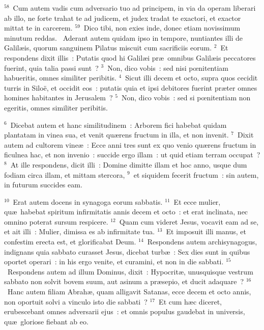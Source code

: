 ${}^{58}$~Cum autem vadis cum adversario tuo ad principem, in via da operam liberari ab illo, ne forte trahat te ad judicem, et judex tradat te exactori, et exactor mittat te in carcerem.
${}^{59}$~Dico tibi, non exies inde, donec etiam novissimum minutum reddas.
~Aderant autem quidam ipso in tempore, nuntiantes illi de Galil\ae is, quorum sanguinem Pilatus miscuit cum sacrificiis eorum.
${}^{2}$~Et respondens dixit illis~: Putatis quod hi Galil\ae i pr\ae\ omnibus Galil\ae is peccatores fuerint, quia talia passi sunt~?
${}^{3}$~Non, dico vobis~: sed nisi pœnitentiam habueritis, omnes similiter peribitis.
${}^{4}$~Sicut illi decem et octo, supra quos cecidit turris in Silo\"e, et occidit eos~: putatis quia et ipsi debitores fuerint pr\ae ter omnes homines habitantes in Jerusalem~?
${}^{5}$~Non, dico vobis~: sed si pœnitentiam non egeritis, omnes similiter peribitis.


${}^{6}$~Dicebat autem et hanc similitudinem~: Arborem fici habebat quidam plantatam in vinea sua, et venit qu\ae rens fructum in illa, et non invenit.
${}^{7}$~Dixit autem ad cultorem vine\ae~: Ecce anni tres sunt ex quo venio qu\ae rens fructum in ficulnea hac, et non invenio~: succide ergo illam~: ut quid etiam terram occupat~?
${}^{8}$~At ille respondens, dicit illi~: Domine dimitte illam et hoc anno, usque dum fodiam circa illam, et mittam stercora,
${}^{9}$~et siquidem fecerit fructum~: sin autem, in futurum succides eam.


${}^{10}$~Erat autem docens in synagoga eorum sabbatis.
${}^{11}$~Et ecce mulier, qu\ae\ habebat spiritum infirmitatis annis decem et octo~: et erat inclinata, nec omnino poterat sursum respicere.
${}^{12}$~Quam cum videret Jesus, vocavit eam ad se, et ait illi~: Mulier, dimissa es ab infirmitate tua.
${}^{13}$~Et imposuit illi manus, et confestim erecta est, et glorificabat Deum.
${}^{14}$~Respondens autem archisynagogus, indignans quia sabbato curasset Jesus, dicebat turb\ae~: Sex dies sunt in quibus oportet operari~: in his ergo venite, et curamini, et non in die sabbati.
${}^{15}$~Respondens autem ad illum Dominus, dixit~: Hypocrit\ae , unusquisque vestrum sabbato non solvit bovem suum, aut asinum a pr\ae sepio, et ducit adaquare~?
${}^{16}$~Hanc autem filiam Abrah\ae , quam alligavit Satanas, ecce decem et octo annis, non oportuit solvi a vinculo isto die sabbati~?
${}^{17}$~Et cum h\ae c diceret, erubescebant omnes adversarii ejus~: et omnis populus gaudebat in universis, qu\ae\ gloriose fiebant ab eo.


